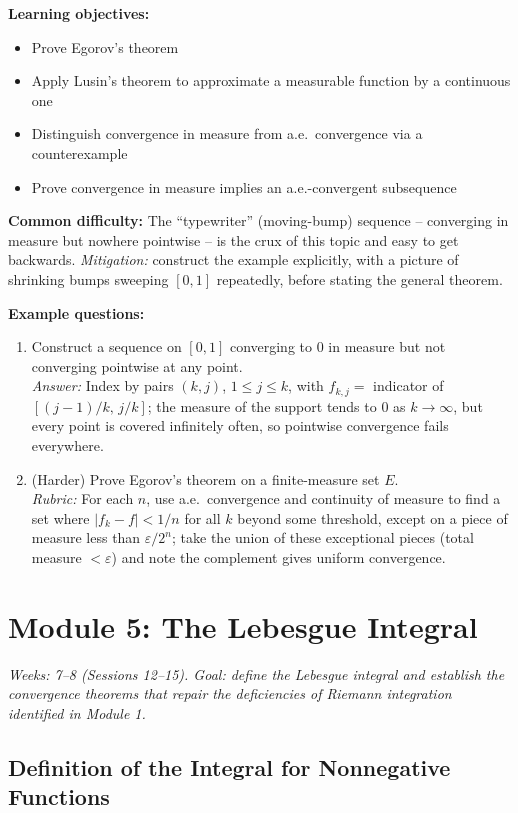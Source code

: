 \documentclass[11pt]{article}
\begin{document}
\textbf{Learning objectives:}
\begin{itemize}[nosep]
\item Prove Egorov's theorem
\item Apply Lusin's theorem to approximate a measurable function by a continuous one
\item Distinguish convergence in measure from a.e.\ convergence via a counterexample
\item Prove convergence in measure implies an a.e.-convergent subsequence
\end{itemize}

\textbf{Common difficulty:} The ``typewriter'' (moving-bump) sequence -- converging in measure but nowhere pointwise -- is the crux of this topic and easy to get backwards. \textit{Mitigation:} construct the example explicitly, with a picture of shrinking bumps sweeping $[0,1]$ repeatedly, before stating the general theorem.

\textbf{Example questions:}
\begin{enumerate}[nosep]
\item Construct a sequence on $[0,1]$ converging to $0$ in measure but not converging pointwise at any point. \\
\textit{Answer:} Index by pairs $(k,j)$, $1\le j\le k$, with $f_{k,j}=$ indicator of $[(j-1)/k,\,j/k]$; the measure of the support tends to $0$ as $k\to\infty$, but every point is covered infinitely often, so pointwise convergence fails everywhere.
\item (Harder) Prove Egorov's theorem on a finite-measure set $E$. \\
\textit{Rubric:} For each $n$, use a.e.\ convergence and continuity of measure to find a set where $|f_k-f|<1/n$ for all $k$ beyond some threshold, except on a piece of measure less than $\varepsilon/2^n$; take the union of these exceptional pieces (total measure $<\varepsilon$) and note the complement gives uniform convergence.
\end{enumerate}

\section{Module 5: The Lebesgue Integral}
\textit{Weeks: 7--8 (Sessions 12--15). Goal: define the Lebesgue integral and establish the convergence theorems that repair the deficiencies of Riemann integration identified in Module 1.}

\subsection{Definition of the Integral for Nonnegative Functions}
\end{document}
